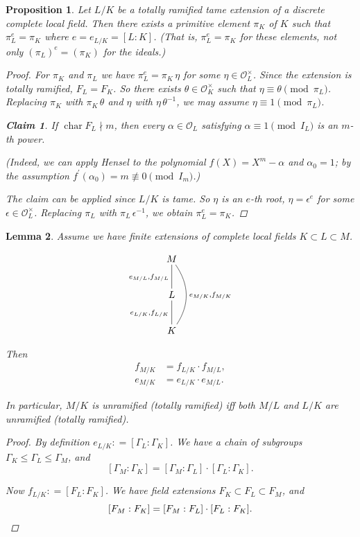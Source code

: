\documentclass{article}
\newcommand{\dfn}{\mathrel{\mathop:}=}
\renewcommand{\O}{\mathcal{O}}
\DeclareMathOperator{\fchar}{char}
\theoremstyle{myplain}
\newtheorem{proposition}{Proposition}[section]
\newtheorem{lemma}[proposition]{Lemma}
\newtheorem*{claim}{Claim}
\theoremstyle{mydefinition}
\begin{document}
\begin{proposition}
  Let $L/K$ be a totally ramified tame extension of a discrete complete local
  field. Then there exists a primitive element $\pi_K$ of $K$ such that
  $\pi_L^e = \pi_K$ where $e = e_{L/K} = [L:K]$. (That is, $\pi_L^e = \pi_K$ for
  these elements, not only $(\pi_L)^e = (\pi_K)$ for the ideals.)

  \begin{proof}
    For $\pi_K$ and $\pi_L$ we have $\pi_L^e = \pi_K \, \eta$ for some
    $\eta \in \O_L^\times$. Since the extension is totally ramified,
    $F_L = F_K$. So there exists $\theta \in \O_K^\times$ such that
    $\eta \equiv \theta \pmod{\pi_L}$. Replacing $\pi_K$ with $\pi_K\,\theta$
    and $\eta$ with $\eta\,\theta^{-1}$, we may assume
    $\eta \equiv 1 \pmod{\pi_L}$.

    \begin{claim}
      If $\fchar F_L \nmid m$, then every $\alpha \in \O_L$ satisfying
      $\alpha \equiv 1 \pmod{I_L}$ is an $m$-th power.
    \end{claim}

    \noindent (Indeed, we can apply Hensel to the polynomial
    $f (X) = X^m - \alpha$ and $\alpha_0 = 1$; by the assumption
    $f^\prime (\alpha_0) = m \not\equiv 0 \pmod{I_m}$.)

    \vspace{1em}

    The claim can be applied since $L/K$ is tame. So $\eta$ is an $e$-th root,
    $\eta = \epsilon^e$ for some $\epsilon \in \O_L^\times$. Replacing $\pi_L$
    with $\pi_L\,\epsilon^{-1}$, we obtain $\pi_L^e = \pi_K$.
  \end{proof}
\end{proposition}

\begin{lemma}\label{lemma:fk-multiplicative}
  Assume we have finite extensions of complete local fields
  $K \subset L \subset M$.

  \[ \xymatrix{
      M\ar@{-}[d]_{e_{M/L}, f_{M/L}} \ar@/^1.5em/@{-}[dd]^{e_{M/K}, f_{M/K}} \\
      L\ar@{-}[d]_{e_{L/K}, f_{L/K}} \\
      K
    } \]

  Then
  \begin{align*}
    f_{M/K} & = f_{L/K} \cdot f_{M/L},\\
    e_{M/K} & = e_{L/K} \cdot e_{M/L}.
  \end{align*}

  In particular, $M/K$ is unramified (totally ramified) iff both $M/L$ and $L/K$
  are unramified (totally ramified).

  \begin{proof}
    By definition $e_{L/K} \dfn [\Gamma_L : \Gamma_K]$. We have a chain of
    subgroups $\Gamma_K \le \Gamma_L \le \Gamma_M$, and
    $$[\Gamma_M : \Gamma_K] = [\Gamma_M : \Gamma_L] \cdot [\Gamma_L : \Gamma_K].$$

    Now $f_{L/K} \dfn [F_L : F_K]$. We have field extensions
    $F_K \subset F_L \subset F_M$, and
    \[ [F_M : F_K] = [F_M : F_L] \cdot [F_L : F_K]. \qedhere \]
  \end{proof}
\end{lemma}
\end{document}
